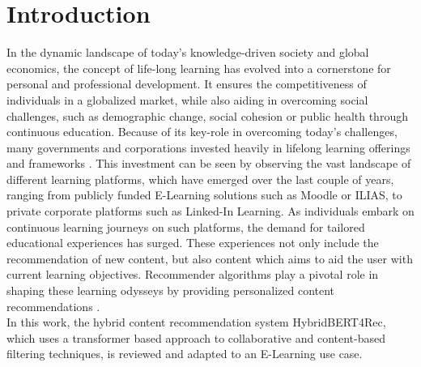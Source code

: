 \documentclass{Academic}
\begin{document}
    \myabstract{}
    \renewcommand{\myTitle}{Hybrid Recommender Models in E-Learning: A Comprehensive Review of HybridBERT4Rec}
    \renewcommand{\MyAuthor}{Leon Knorr}
    \renewcommand{\MyDepartment}{Mannheim Master of Datascience}
    \renewcommand{\ID}{1902854}
    \renewcommand{\Keywords}{Education, AI, E-Learning}
    \maketitle

    \section{Introduction}
    In the dynamic landscape of today's knowledge-driven society and global economics, the concept of life-long learning has evolved into a cornerstone for personal and professional development. It ensures the competitiveness of individuals in a globalized market, while also aiding in overcoming social challenges, such as demographic change, social cohesion or public health through continuous education. Because of its key-role in overcoming today's challenges, many governments and corporations invested heavily in lifelong learning offerings and frameworks \cite{rubensonAdultLearningEducation2011}. This investment can be seen by observing the vast landscape of different learning platforms, which have emerged over the last couple of years, ranging from publicly funded E-Learning solutions such as Moodle\cite{StartseiteMoodleOrg} or ILIAS\cite{Ilias}, to private corporate platforms such as Linked-In Learning\cite{LinkedInLearningMit}. As individuals embark on continuous learning journeys on such platforms, the demand for tailored educational experiences has surged. These experiences not only include the recommendation of new content, but also content which aims to aid the user with current learning objectives. Recommender algorithms play a pivotal role in shaping these learning odysseys by providing personalized content recommendations \cite{jeevamolOntologybasedHybridElearning2021}. \\
    In this work, the hybrid content recommendation system HybridBERT4Rec, which uses a transformer based approach to collaborative and content-based filtering techniques, is reviewed and adapted to an E-Learning use case.
\end{document}
